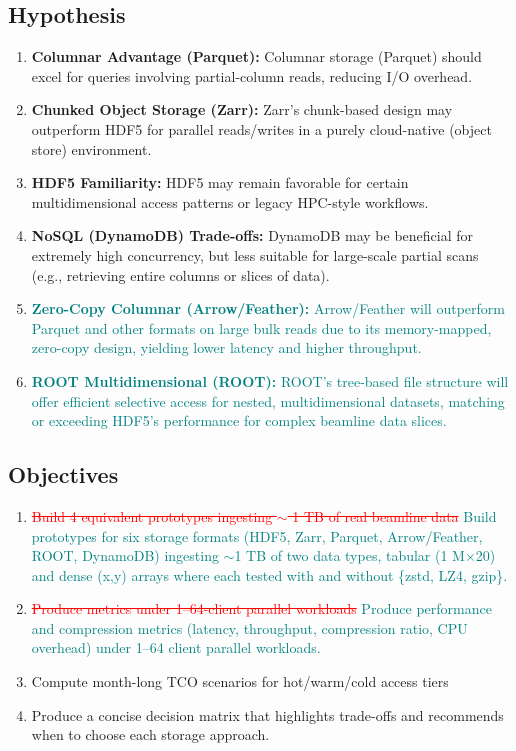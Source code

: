 \documentclass{article}
\begin{document}
\subsection{Hypothesis}
\begin{enumerate}
    \item \textbf{Columnar Advantage (Parquet):} Columnar storage (Parquet) should excel for queries involving partial-column reads, reducing I/O overhead.
    \item \textbf{Chunked Object Storage (Zarr):} Zarr’s chunk-based design may outperform HDF5 for parallel reads/writes in a purely cloud-native (object store) environment.
    \item \textbf{HDF5 Familiarity:} HDF5 may remain favorable for certain multidimensional access patterns or legacy HPC-style workflows.
    \item \textbf{NoSQL (DynamoDB) Trade-offs:} DynamoDB may be beneficial for extremely high concurrency, but less suitable for large-scale partial scans (e.g., retrieving entire columns or slices of data).
    \item \textcolor{teal}{\textbf{Zero-Copy Columnar (Arrow/Feather):} Arrow/Feather will outperform Parquet and other formats on large bulk reads due to its memory-mapped, zero-copy design, yielding lower latency and higher throughput.}
    \item \textcolor{teal}{\textbf{ROOT Multidimensional (ROOT):} ROOT’s tree-based file structure will offer efficient selective access for nested, multidimensional datasets, matching or exceeding HDF5’s performance for complex beamline data slices.}

\end{enumerate}

\subsection{Objectives}
\begin{enumerate}
    \item \textcolor{red}{\sout{Build 4 equivalent prototypes ingesting $\sim$ 1 TB of real beamline data}}
          \textcolor{teal}{Build prototypes for six storage formats (HDF5, Zarr, Parquet, Arrow/Feather, ROOT, DynamoDB) ingesting $\sim$1 TB of two data types, tabular (1 M×20) and dense (x,y) arrays where each tested with and without \{zstd, LZ4, gzip\}.}
    \item \textcolor{red}{\sout{Produce metrics under 1–64-client parallel workloads}}
          \textcolor{teal}{Produce performance and compression metrics (latency, throughput, compression ratio, CPU overhead) under 1–64 client parallel workloads.}
    \item Compute month-long TCO scenarios for hot/warm/cold access tiers
    \item Produce a concise decision matrix that highlights trade-offs and recommends when to choose each storage approach.
\end{enumerate}
\end{document}
